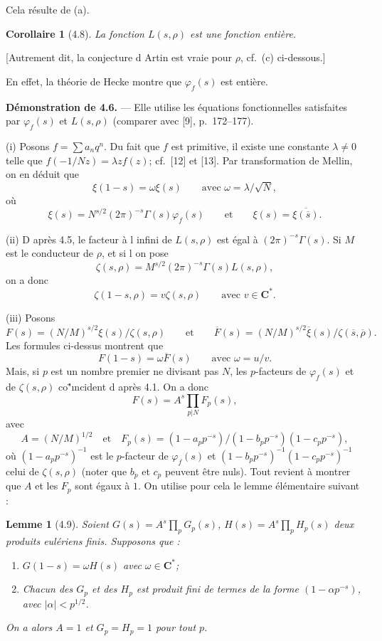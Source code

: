 \documentclass[11pt]{amsart}
\theoremstyle{plain}
\newtheorem{lemme}[theoreme]{Lemme}
\newtheorem{corollaire}[theoreme]{Corollaire}
\theoremstyle{definition}
\theoremstyle{remark}
\newcommand{\C}{\mathbf{C}}
\begin{document}
Cela r\'esulte de (a).

\begin{corollaire}[4.8]
La fonction $L(s, \rho)$ est une fonction enti\`ere.
\end{corollaire}

[Autrement dit, la conjecture d Artin est vraie pour $\rho$, cf.~(c) ci-dessous.]

En effet, la th\'eorie de Hecke montre que $\varphi_f(s)$ est enti\`ere.

\noindent\textbf{D\'emonstration de 4.6.} --- Elle utilise les \'equations fonctionnelles satisfaites par $\varphi_f(s)$ et $L(s, \rho)$ (comparer avec [9], p.~172--177).

(i) Posons $f = \sum a_n q^n$. Du fait que $f$ est primitive, il existe une constante $\lambda \ne 0$ telle que $f(-1/Nz) = \lambda z f(z)$; cf.~[12] et [13]. Par transformation de Mellin, on en d\'eduit que
$$\xi(1-s) = \omega \xi(s) \qquad \text{avec } \omega = \lambda / \sqrt{N},$$
o\`u
$$\xi(s) = N^{s/2} (2\pi)^{-s} \Gamma(s) \varphi_f(s) \qquad \text{et} \qquad \xi(s) = \overline{\xi(\overline{s})}.$$

(ii) D apr\`es 4.5, le facteur \`a l infini de $L(s, \rho)$ est \'egal \`a $(2\pi)^{-s} \Gamma(s)$. Si $M$ est le conducteur de $\rho$, et si l on pose
$$\zeta(s, \rho) = M^{s/2} (2\pi)^{-s} \Gamma(s) L(s, \rho),$$
on a donc
$$\zeta(1-s, \rho) = v \zeta(s, \rho) \qquad \text{avec } v \in \C^*.$$

(iii) Posons
$$F(s) = (N/M)^{s/2} \xi(s) / \zeta(s, \rho) \qquad \text{et} \qquad \overline{F}(s) = (N/M)^{s/2} \overline{\xi}(s) / \zeta(\overline{s}, \overline{\rho}).$$
Les formules ci-dessus montrent que
$$F(1-s) = \omega \overline{F}(s) \qquad \text{avec } \omega = u/v.$$
Mais, si $p$ est un nombre premier ne divisant pas $N$, les $p$-facteurs de $\varphi_f(s)$ et de $\zeta(s, \rho)$ co\"  "\i ncident d apr\`es 4.1. On a donc
$$F(s) = A^s \prod_{p|N} F_p(s),$$
avec
$$A = (N/M)^{1/2} \quad \text{et} \quad F_p(s) = (1 - a_p p^{-s}) / (1 - b_p p^{-s})(1 - c_p p^{-s}),$$
o\`u $(1 - a_p p^{-s})^{-1}$ est le $p$-facteur de $\varphi_f(s)$ et $(1 - b_p p^{-s})^{-1}(1 - c_p p^{-s})^{-1}$ celui de $\zeta(s, \rho)$ (noter que $b_p$ et $c_p$ peuvent \^etre nuls). Tout revient \`a montrer que $A$ et les $F_p$ sont \'egaux \`a $1$.
On utilise pour cela le lemme \'el\'ementaire suivant :

\begin{lemme}[4.9]
Soient $G(s) = A^s \prod_p G_p(s)$, $H(s) = A^s \prod_p H_p(s)$ deux produits eul\'eriens finis. Supposons que :
\begin{enumerate}
\item[(4.9.1)] $G(1-s) = \omega H(s)$ avec $\omega \in \C^*$;
\item[(4.9.2)] Chacun des $G_p$ et des $H_p$ est produit fini de termes de la forme $(1 - \alpha p^{-s})$, avec $|\alpha| < p^{1/2}$.
\end{enumerate}
On a alors $A = 1$ et $G_p = H_p = 1$ pour tout $p$.
\end{lemme}
\end{document}
